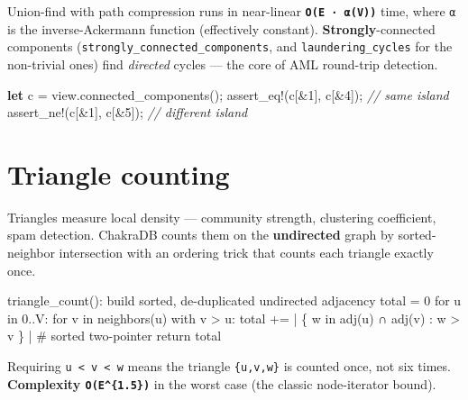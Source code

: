 \documentclass[
  11pt,
  openany]{book}
\newenvironment{Shaded}{}{}
\newcommand{\CommentTok}[1]{\textcolor[rgb]{0.38,0.63,0.69}{\textit{#1}}}
\newcommand{\DecValTok}[1]{\textcolor[rgb]{0.25,0.63,0.44}{#1}}
\newcommand{\KeywordTok}[1]{\textcolor[rgb]{0.00,0.44,0.13}{\textbf{#1}}}
\newcommand{\NormalTok}[1]{#1}
\newcommand{\OperatorTok}[1]{\textcolor[rgb]{0.40,0.40,0.40}{#1}}
\newcommand{\PreprocessorTok}[1]{\textcolor[rgb]{0.74,0.48,0.00}{#1}}
\begin{document}
Union-find with path compression runs in near-linear
\textbf{\texttt{O(E\ ·\ α(V))}} time, where \texttt{α} is the
inverse-Ackermann function (effectively constant).
\textbf{Strongly}-connected components
(\texttt{strongly\_connected\_components}, and
\texttt{laundering\_cycles} for the non-trivial ones) find
\emph{directed} cycles --- the core of AML round-trip detection.

\begin{Shaded}
\begin{Highlighting}[]
\KeywordTok{let}\NormalTok{ c }\OperatorTok{=}\NormalTok{ view}\OperatorTok{.}\NormalTok{connected\_components()}\OperatorTok{;}
\PreprocessorTok{assert\_eq!}\NormalTok{(c[}\OperatorTok{\&}\DecValTok{1}\NormalTok{]}\OperatorTok{,}\NormalTok{ c[}\OperatorTok{\&}\DecValTok{4}\NormalTok{])}\OperatorTok{;}   \CommentTok{// same island}
\PreprocessorTok{assert\_ne!}\NormalTok{(c[}\OperatorTok{\&}\DecValTok{1}\NormalTok{]}\OperatorTok{,}\NormalTok{ c[}\OperatorTok{\&}\DecValTok{5}\NormalTok{])}\OperatorTok{;}   \CommentTok{// different island}
\end{Highlighting}
\end{Shaded}

\section{Triangle counting}\label{triangle-counting}

Triangles measure local density --- community strength, clustering
coefficient, spam detection. ChakraDB counts them on the
\textbf{undirected} graph by sorted-neighbor intersection with an
ordering trick that counts each triangle exactly once.

\begin{Shaded}
\begin{Highlighting}[]
\NormalTok{triangle\_count():}
\NormalTok{  build sorted, de{-}duplicated undirected adjacency}
\NormalTok{  total = 0}
\NormalTok{  for u in 0..V:}
\NormalTok{    for v in neighbors(u) with v \textgreater{} u:}
\NormalTok{      total += | \{ w in adj(u) ∩ adj(v) : w \textgreater{} v \} |   \# sorted two{-}pointer}
\NormalTok{  return total}
\end{Highlighting}
\end{Shaded}

Requiring \texttt{u\ \textless{}\ v\ \textless{}\ w} means the triangle
\texttt{\{u,v,w\}} is counted once, not six times. \textbf{Complexity
\texttt{O(E\^{}\{1.5\})}} in the worst case (the classic node-iterator
bound).
\end{document}
